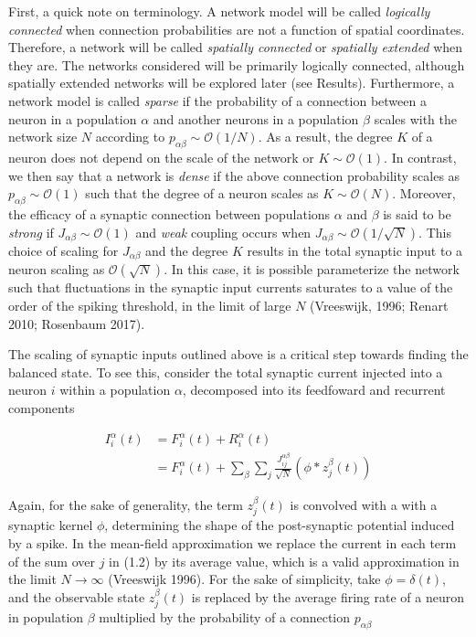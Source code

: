 \documentclass{ucetd}
\begin{document}
First, a quick note on terminology. A network model will be called \emph{logically connected} when connection probabilities are not a function of spatial coordinates. Therefore, a network will be called \emph{spatially connected} or \emph{spatially extended} when they are. The networks considered will be primarily logically connected, although spatially extended networks will be explored later (see Results). Furthermore, a network model is called \emph{sparse} if the probability of a connection between a neuron in a population $\alpha$ and another neurons in a population $\beta$ scales with the network size $N$ according to $p_{\alpha\beta} \sim \mathcal{O}(1/N)$. As a result, the degree $K$ of a neuron does not depend on the scale of the network or $K \sim \mathcal{O}(1)$. In contrast, we then say that a network is \emph{dense} if the above connection probability scales as $p_{\alpha\beta} \sim \mathcal{O}(1)$ such that the degree of a neuron scales as $K \sim \mathcal{O}(N)$. Moreover, the efficacy of a synaptic connection between populations $\alpha$ and $\beta$ is said to be \emph{strong} if $J_{\alpha\beta} \sim \mathcal{O}(1)$ and \emph{weak} coupling occurs when $J_{\alpha\beta} \sim \mathcal{O}(1/\sqrt{N})$. This choice of scaling for $J_{\alpha\beta}$ and the degree $K$ results in the total synaptic input to a neuron scaling as $\mathcal{O}(\sqrt{N})$. In this case, it is possible parameterize the network such that fluctuations in the synaptic input currents saturates to a value of the order of the spiking threshold, in the limit of large $N$ (Vreeswijk, 1996; Renart 2010; Rosenbaum 2017).  

The scaling of synaptic inputs outlined above is a critical step towards finding the balanced state. To see this, consider the total synaptic current injected into a neuron $i$ within a population $\alpha$, decomposed into its feedfoward and recurrent components

\begin{align}
I_{i}^{\alpha}(t) &= F_{i}^{\alpha}(t) + R_{i}^{\alpha}(t)\\
&= F_{i}^{\alpha}(t) + \sum_{\beta}\sum_{j} \frac{J_{ij}^{\alpha\beta}}{\sqrt{N}}(\phi * z^{\beta}_{j}(t))
\end{align}

Again, for the sake of generality, the term $z^{\beta}_{j}(t)$ is convolved with a with a synaptic kernel $\phi$, determining the shape of the post-synaptic potential induced by a spike. In the mean-field approximation we replace the current in each term of the sum over $j$ in (1.2) by its average value, which is a valid approximation in the limit $N\rightarrow\infty$ (Vreeswijk 1996). For the sake of simplicity, take $\phi = \delta(t)$, and the observable state $z^{\beta}_{j}(t)$ is replaced by the average firing rate of a neuron in population $\beta$ multiplied by the probability of a connection $p_{\alpha\beta}$
\end{document}
